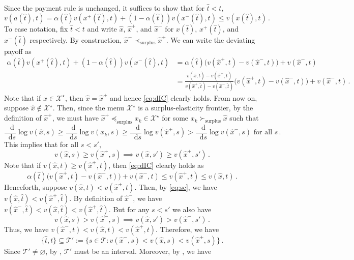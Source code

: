 \documentclass[12pt,letterpaper]{article}
\newenvironment{original}{\color{black}\noindent}{}
\theoremstyle{plain}
\theoremstyle{definition}
\theoremstyle{remark}
\let\emptyset\varnothing
\renewcommand{\1}{\mathds{1}}
\renewcommand*\d{\mathop{}\!\mathrm{d}}
\newcommand{\X}{\mathcal{X}}
\theoremstyle{definition}
\begin{document}
\begin{original}
Since the payment rule is unchanged, it suffices to show that for $\hat{t} < t$,
\[v(a(\hat{t}), t) = \alpha(\hat{t}) v(x^{+}(\hat{t}), t) + (1 - \alpha(\hat{t})) v(x^{-}(\hat{t}), t)  \leq v(x(\hat{t}), t)\,.\label{eq:dIC}\tag{A.1}\]
To ease notation, fix $\hat{t} < t$ and write $\hat{x}$, $\hat{x}^+$, and $\hat{x}^-$ for $x(\hat{t})$, $x^{+}(\hat{t})$, and $x^{-}(\hat{t})$ respectively. By construction, $\hat{x}^- \prec_{\text{surplus}} \hat{x}^+$. We can write the deviating payoff as
\begin{align*}
\alpha(\hat{t}) v(x^{+}(\hat{t}), t) + (1 - \alpha(\hat{t})) v(x^{-}(\hat{t}), t) &= \alpha(\hat{t})\big(v(\hat{x}^+, t) - v(\hat{x}^-, t)\big) +v(\hat{x}^-, t)    \\
 &= \frac{v(\hat{x}, \hat{t}) - v(\hat{x}^{-}, \hat{t})}{ v(\hat{x}^{+}, \hat{t}) -  v(\hat{x}^{-}, \hat{t})}\big(v(\hat{x}^+, t) - v(\hat{x}^-, t)\big) +v(\hat{x}^-, t)\,.
\end{align*}
Note that if $\hat{x} \in \X^\star$, then $\hat{x}=\hat{x}^+$ and hence \eqref{eq:dIC} clearly holds. From now on, suppose $\hat{x} \not\in \X^\star$. Then, since the menu $\X^\star$ is a surplus-elasticity frontier, by the definition of $\hat{x}^+$, we must have $\hat{x}^+ \preceq_{\text{surplus}} x_k \in \X^\star$ for some $x_k \succ_{\text{surplus}} \hat{x}$ such that
\[\frac{\d}{\d s}\log v(\hat{x}, s) \geq \frac{\d}{\d s}\log v(x_k, s) \geq \frac{\d}{\d s} \log v(\hat{x}^+, s) > \frac{\d}{\d s} \log v(\hat{x}^-, s)\text{ for all $s$}\,. \]
This implies that for all $s < s'$,
\[v(\hat{x}, s)\geq v(\hat{x}^+, s) \implies v(\hat{x}, s')\geq v(\hat{x}^+, s')\,. \label{eq:sc} \tag{A.2}\]
Note that if $v(\hat{x}, t) \geq v(\hat{x}^+, t)$, then \eqref{eq:dIC} clearly holds as
\[\alpha(\hat{t})\big(v(\hat{x}^+, t) - v(\hat{x}^-, t)\big) +v(\hat{x}^-, t)\leq v(\hat{x}^+, t) \leq v(\hat{x}, t)\,.\]
Henceforth, suppose $v(\hat{x}, t) < v(\hat{x}^+, t)$. Then, by \eqref{eq:sc}, we have $v(\hat{x}, \hat{t}) < v(\hat{x}^+, \hat{t})$. By definition of $\hat{x}^-$, we have $v(\hat{x}^-, \hat{t})< v(\hat{x}, \hat{t}) < v(\hat{x}^+, \hat{t})$. But for any $s < s'$ we also have
\[v(\hat{x}, s) > v(\hat{x}^-, s) \implies v(\hat{x}, s')> v(\hat{x}^-, s')\,. \label{eq:sc2} \tag{A.3}\]
Thus, we have $v(\hat{x}^-, t) < v(\hat{x}, t) < v(\hat{x}^+, t)$. Therefore, we have
\[\{\hat{t}, t\} \subseteq \mathcal{T}':=\big\{s\in \mathcal{T}: v(\hat{x}^-, s) < v(\hat{x}, s) < v(\hat{x}^+, s)\big\}\,.\]
Since $\mathcal{T}' \neq \emptyset$, by , $\mathcal{T}'$ must be an interval. Moreover, by , we have

\end{original}
\end{document}
